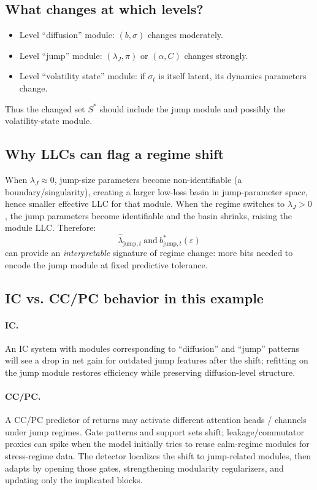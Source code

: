 \documentclass[11pt]{article}
\begin{document}
\subsection{What changes at which levels?}
\begin{itemize}
  \item Level ``diffusion'' module: $(b,\sigma)$ changes moderately.
  \item Level ``jump'' module: $(\lambda_J,\pi)$ or $(\alpha,C)$ changes strongly.
  \item Level ``volatility state'' module: if $\sigma_t$ is itself latent, its dynamics parameters change.
\end{itemize}
Thus the changed set $S^\ast$ should include the jump module and possibly the volatility-state module.

\subsection{Why LLCs can flag a regime shift}
When $\lambda_J \approx 0$, jump-size parameters become non-identifiable (a boundary/singularity),
creating a larger low-loss basin in jump-parameter space, hence smaller effective LLC for that module.
When the regime switches to $\lambda_J>0$, the jump parameters become identifiable and the basin shrinks,
raising the module LLC. Therefore:
\[
\hat\lambda_{\mathrm{jump},t}\ \text{and}\ b^\ast_{\mathrm{jump},t}(\varepsilon)
\]
can provide an \emph{interpretable} signature of regime change:
more bits needed to encode the jump module at fixed predictive tolerance.

\subsection{IC vs. CC/PC behavior in this example}
\paragraph{IC.}
An IC system with modules corresponding to ``diffusion'' and ``jump'' patterns will see a drop in net gain
for outdated jump features after the shift; refitting on the jump module restores efficiency while preserving
diffusion-level structure.

\paragraph{CC/PC.}
A CC/PC predictor of returns may activate different attention heads / channels under jump regimes.
Gate patterns and support sets shift; leakage/commutator proxies can spike when the model initially tries
to reuse calm-regime modules for stress-regime data. The detector localizes the shift to jump-related modules,
then adapts by opening those gates, strengthening modularity regularizers, and updating only the implicated blocks.
\end{document}
